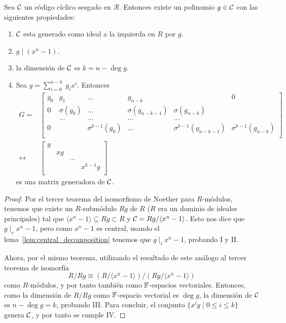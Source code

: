 \begin{theorem}
Sea \(\mathcal{C}\) un código cíclico sesgado en \(\mathcal{R}\). Entonces existe un polinomio \(g \in \mathcal{C}\) con las siguientes propiedades:

\begin{enumerate}[label=\roman*.]
    \item \(\mathcal{C}\) esta generado como ideal a la izquierda en \(R\) por \(g\).\label{it:1}
    \item \(g \mid (x^{n} - 1) \).
    \item la dimensión de \(\mathcal{C}\) es \(k = n - \deg g \).
    \item
    Sea \(g = \sum_{i=0}^{n-k}\ g_i x^{i}\). Entonces
    \[
    \begin{aligned}
    G =&
    \begin{bmatrix}
        g_0 & g_1 & \ldots & g_{n-k} & & 0 \\
        0 & \sigma(g_0) & \ldots & \sigma(g_{n-k-1}) & \sigma(g_{n-k}) & \\
          & \ldots &  \ldots &  \ldots & \ldots &\\
        0 &  & \sigma^{k-1}(g_0) & \ldots & \sigma^{k-1}(g_{n-k-1}) & \sigma^{k-1}(g_{n-k}) \\
    \end{bmatrix} \\
    \leftrightarrow &
    \begin{bmatrix}
       g & & & \\
       & xg & & \\
       & & \ldots & \\
       & &  & x^{k-1}g \\
    \end{bmatrix}
    \end{aligned}
    \]
    es una matrix generadora de \(\mathcal{C}\).
\end{enumerate}
\end{theorem}

\begin{proof}
Por el tercer teorema del isomorfismo de Noether para \(R\)-módulos, tenemos que existe un \(R\)-submódulo \(Rg\) de \(R\) (\(R\) era un dominio de ideales principales) tal que \(\langle x^{n} - 1 \rangle \subseteq Rg \subset R\) y \(\mathcal{C} = Rg / \langle x^{n} - 1 \rangle\). Esto nos dice que \(g \mid_r x^{n} -1\), pero como \(x^{n} - 1\) es central, usando el lema~\ref{lem:central_decomposition} tenemos que \(g  \mid_l x^{n} - 1\), probando I y II.

Ahora, por el mismo teorema, utilizando el resultado de este análogo al tercer teorema de isomorfía
\[
R / Rg \cong (R / \langle x^{n} -1 \rangle) / (Rg / \langle x^{n} -1 \rangle)
\]
como \(R\)-módulos, y por tanto también como  \(\mathbb{F}\)-espacios vectoriales. Entonces, como la dimensión de \(R / Rg\) como  \(\mathbb{F}\)-espacio vectorial es \(\deg g\), la dimensión de \(\mathcal{C}\) es \(n - \deg g = k\), probando III. Para concluir, el conjunto \(\{x^{i}g \mid 0 \le i \le k\}\) genera \(\mathcal{C}\), y por tanto se cumple IV.
\end{proof}

